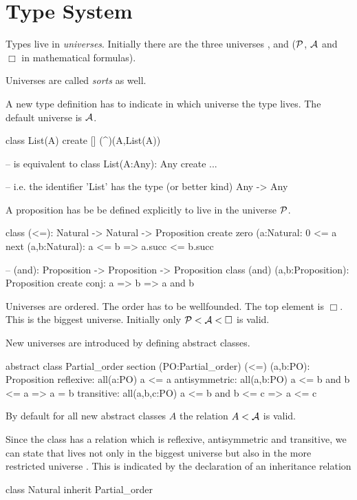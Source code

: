 \section{Type System}

Types live in \emph{universes}. Initially there are the three universes
,  and  ($\cal{P}$, $\cal{A}$ and $\Box$ in
mathematical formulas).

Universes are called \emph{sorts} as well.

A new type definition has to indicate in which universe the type lives. The
default universe is $\cal{A}$.

\begin{alba}
  class List(A) create [] (^)(A,List(A))

  -- is equivalent to
  class List(A:Any): Any create ...

  -- i.e. the identifier 'List' has the type (or better kind)
  Any -> Any
\end{alba}

A proposition has be be defined explicitly to live in the universe $\cal{P}$.
%
\begin{alba}
  class (<=): Natural -> Natural -> Proposition create
    zero (a:Natural: 0 <= a
    next (a,b:Natural): a <= b => a.succ <= b.succ

  -- (and): Proposition -> Proposition -> Proposition
  class (and) (a,b:Proposition): Proposition create
    conj: a => b => a and b
\end{alba}

Universes are ordered. The order has to be wellfounded. The top element is
$\Box$. This is the biggest universe. Initially only $\cal{P} < \cal{A} < \Box$ is
valid.

New universes are introduced by defining abstract classes.
\begin{alba}
  abstract class Partial_order
    section (PO:Partial_order)
      (<=) (a,b:PO): Proposition
      reflexive: all(a:PO)
        a <= a
      antisymmetric: all(a,b:PO)
        a <= b  and  b <= a
        =>  a = b
      transitive: all(a,b,c:PO)
        a <= b and b <= c
        => a <= c
\end{alba}
%
By default for all new abstract classes $A$ the relation $A < \cal{A}$ is
valid.

Since the class  has a relation \code{<=} which is reflexive,
antisymmetric and transitive, we can state that  lives not only
in the biggest universe  but also in the more restricted universe
. This is indicated by the declaration of an
inheritance relation
%
\begin{alba}
  class Natural inherit Partial_order
\end{alba}

